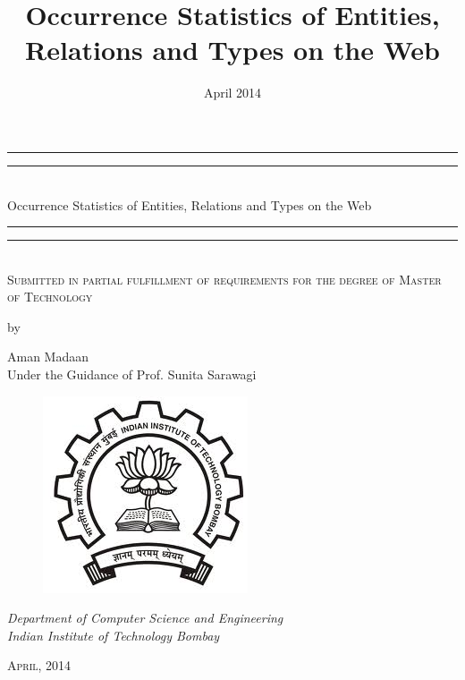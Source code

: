 \documentclass[DIV=calc, paper=a4, fontsize=11pt, twocolumn]{article}
\title{Occurrence Statistics of Entities, Relations and Types on the Web} %
\date{April 2014} %
\begin{document}
\begin{titlepage}
    \centering
    \vspace*{\baselineskip}
    \rule{\textwidth}{1.6pt}\vspace*{-\baselineskip}\vspace*{2pt}
    \rule{\textwidth}{0.4pt}\\[\baselineskip]
    {\LARGE \color{DarkBlue} Occurrence Statistics of Entities, Relations and Types on the Web}\\[0.2\baselineskip]
    \rule{ \textwidth}{0.4pt}\vspace*{-\baselineskip}\vspace{3.2pt}
    \rule{\textwidth}{1.6pt}\\[\baselineskip]
    \scshape
    Submitted in partial fulfillment of requirements for the degree of
    Master of Technology \par
    \vspace*{1\baselineskip}
     by \\[\baselineskip]
    {\Large  Aman Madaan \vspace*{1\baselineskip} \\ Under the Guidance of Prof. Sunita Sarawagi\par}
       \begin{figure}[h]
 \centering
 \vspace*{13\baselineskip}
 \includegraphics[bb=0 0 229 220,scale=0.35]{./iitb_logo.jpg}
\end{figure}

    {\vspace*{1\baselineskip}  \itshape Department of Computer Science and Engineering \\ Indian Institute of Technology Bombay\par}
    \vfill
 
    {\scshape April, 2014} \\
    {\large }\par
  \end{titlepage}
  
\end{document}
